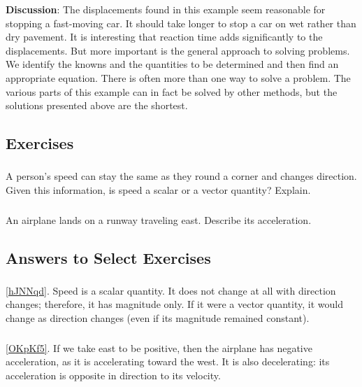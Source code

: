 \documentclass[main-ap-physics.tex]{subfiles}
\begin{document}
\textbf{Discussion}: The displacements found in this example seem reasonable for stopping a fast-moving car. It should take longer to stop a car on wet rather than dry pavement. It is interesting that reaction time adds significantly to the displacements. But more important is the general approach to solving problems. We identify the knowns and the quantities to be determined and then find an appropriate equation. There is often more than one way to solve a problem. The various parts of this example can in fact be solved by other methods, but the solutions presented above are the shortest.

\endsolution


\clearpage

\subsection{Exercises}

\subsubsection*{} %

\begin{exercise} \label{hJNNqd}
    A person's speed can stay the same as they round a corner and changes direction. Given this information, is speed a scalar or a vector quantity? Explain.
\end{exercise}

\subsubsection*{} %

\begin{exercise} \label{OKpKf5}
    An airplane lands on a runway traveling east. Describe its acceleration.
\end{exercise}

\subsection{Answers to Select Exercises}

\subsubsection*{} %

\ref{hJNNqd}. Speed is a scalar quantity. It does not change at all with direction changes; therefore, it has magnitude only. If it were a vector quantity, it would change as direction changes (even if its magnitude remained constant).\\

\subsubsection*{} %

\ref{OKpKf5}. If we take east to be positive, then the airplane has negative acceleration, as it is accelerating toward the west. It is also decelerating: its acceleration is opposite in direction to its velocity.\\
\end{document}
